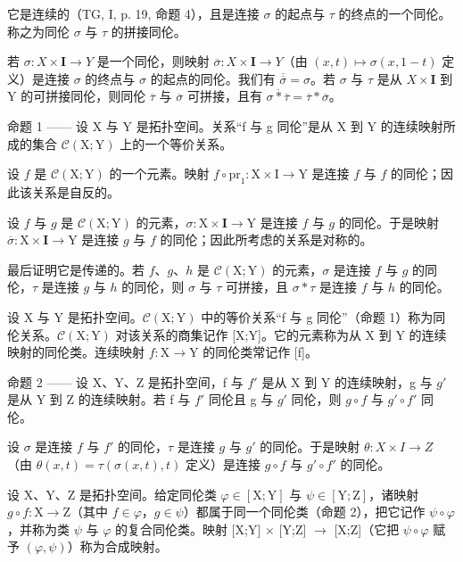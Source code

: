它是连续的（TG, I, p. 19, 命题 4），且是连接 \(\sigma\) 的起点与 \(\tau\) 的终点的一个同伦。称之为同伦 \(\sigma\) 与 \(\tau\) 的拼接同伦。

若 \(\sigma\colon X\times\mathbf{I}\to Y\) 是一个同伦，则映射 \(\overline{\sigma}\colon X\times\mathbf{I}\to Y\)（由 \((x,t)\mapsto\sigma(x,1-t)\) 定义）是连接 \(\sigma\) 的终点与 \(\sigma\) 的起点的同伦。我们有 \(\overline{\overline{\sigma}}=\sigma\)。若 \(\sigma\) 与 \(\tau\) 是从 \(X\times\mathbf{I}\) 到 Y 的可拼接同伦，则同伦 \(\overline{\tau}\) 与 \(\overline{\sigma}\) 可拼接，且有 \(\overline{\sigma*\overline{\tau}}=\overline{\tau}*\overline{\sigma}\)。

命题 1 —— 设 X 与 Y 是拓扑空间。关系“f 与 g 同伦”是从 X 到 Y 的连续映射所成的集合 \(\mathcal{C}(\mathrm{X};\mathrm{Y})\) 上的一个等价关系。

设 \(f\) 是 \(\mathcal{C}(\mathrm{X};\mathrm{Y})\) 的一个元素。映射 \(f\circ\mathrm{pr}_{1}\colon\mathrm{X}\times\mathrm{I}\to\mathrm{Y}\) 是连接 \(f\) 与 \(f\) 的同伦；因此该关系是自反的。

设 \(f\) 与 \(g\) 是 \(\mathcal{C}(\mathrm{X};\mathrm{Y})\) 的元素，\(\sigma\colon\mathrm{X}\times\mathbf{I}\to\mathrm{Y}\) 是连接 \(f\) 与 \(g\) 的同伦。于是映射 \(\overline{\sigma}\colon\mathrm{X}\times\mathbf{I}\to\mathrm{Y}\) 是连接 \(g\) 与 \(f\) 的同伦；因此所考虑的关系是对称的。

最后证明它是传递的。若 \(f\)、\(g\)、\(h\) 是 \(\mathcal{C}(\mathrm{X};\mathrm{Y})\) 的元素，\(\sigma\) 是连接 \(f\) 与 \(g\) 的同伦，\(\tau\) 是连接 \(g\) 与 \(h\) 的同伦，则 \(\sigma\) 与 \(\tau\) 可拼接，且 \(\sigma*\tau\) 是连接 \(f\) 与 \(h\) 的同伦。

设 X 与 Y 是拓扑空间。\(\mathcal{C}(\mathrm{X};\mathrm{Y})\) 中的等价关系“f 与 g 同伦”（命题 1）称为同伦关系。\(\mathcal{C}(\mathrm{X};\mathrm{Y})\) 对该关系的商集记作 {[}X;Y{]}。它的元素称为从 X 到 Y 的连续映射的同伦类。连续映射 \(f\colon \mathrm{X}\to \mathrm{Y}\) 的同伦类常记作 {[}f{]}。

命题 2 —— 设 X、Y、Z 是拓扑空间，f 与 \(f'\) 是从 X 到 Y 的连续映射，g 与 \(g'\) 是从 Y 到 Z 的连续映射。若 f 与 \(f'\) 同伦且 g 与 \(g'\) 同伦，则 \(g \circ f\) 与 \(g' \circ f'\) 同伦。

设 \(\sigma\) 是连接 \(f\) 与 \(f'\) 的同伦，\(\tau\) 是连接 \(g\) 与 \(g'\) 的同伦。于是映射 \(\theta\colon X\times I\to Z\)（由 \(\theta(x,t)=\tau(\sigma(x,t),t)\) 定义）是连接 \(g\circ f\) 与 \(g'\circ f'\) 的同伦。

设 X、Y、Z 是拓扑空间。给定同伦类 \(\varphi \in [\mathrm{X};\mathrm{Y}]\) 与 \(\psi \in [\mathrm{Y};\mathrm{Z}]\)，诸映射 \(g \circ f: \mathrm{X} \to \mathrm{Z}\)（其中 \(f \in \varphi\)，\(g \in \psi\)）都属于同一个同伦类（命题 2），把它记作 \(\psi \circ \varphi\)，并称为类 \(\psi\) 与 \(\varphi\) 的复合同伦类。映射 {[}X;Y{]} \(\times\) {[}Y;Z{]} \(\to\) {[}X;Z{]}（它把 \(\psi \circ \varphi\) 赋予 \((\varphi,\psi)\)）称为合成映射。

